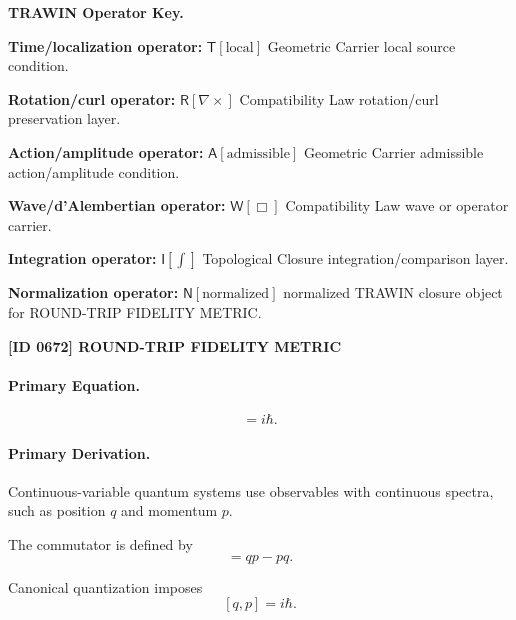 \par\vspace{0.45\baselineskip}
\noindent\begin{minipage}[t]{\linewidth}
\begingroup
\small
\raggedright
\textbf{TRAWIN Operator Key.}\par
\noindent\textbf{Time/localization operator:} $\mathsf{T}\!\left[\mathrm{local}\right]$ Geometric Carrier local source condition.\par
\noindent\textbf{Rotation/curl operator:} $\mathsf{R}\!\left[\nabla\times\right]$ Compatibility Law rotation/curl preservation layer.\par
\noindent\textbf{Action/amplitude operator:} $\mathsf{A}\!\left[\mathrm{admissible}\right]$ Geometric Carrier admissible action/amplitude condition.\par
\noindent\textbf{Wave/d'Alembertian operator:} $\mathsf{W}\!\left[\Box\right]$ Compatibility Law wave or operator carrier.\par
\noindent\textbf{Integration operator:} $\mathsf{I}\!\left[\int\right]$ Topological Closure integration/comparison layer.\par
\noindent\textbf{Normalization operator:} $\mathsf{N}\!\left[\mathrm{normalized}\right]$ normalized TRAWIN closure object for ROUND-TRIP FIDELITY METRIC.\par
\endgroup
\end{minipage}

\clearpage
\noindent\textbf{[ID 0672] ROUND-TRIP FIDELITY METRIC}\par
\vspace{0.35em}
\paragraph{Primary Equation.}
\begin{equation}
[q,p]=i\hbar .
\end{equation}

\paragraph{Primary Derivation.}
Continuous-variable quantum systems use observables with continuous spectra, such as position $q$ and momentum $p$.

The commutator is defined by
\begin{equation}
[q,p]=qp-pq .
\end{equation}

Canonical quantization imposes
\begin{equation}
\boxed{
[q,p]=i\hbar .
}
\end{equation}

